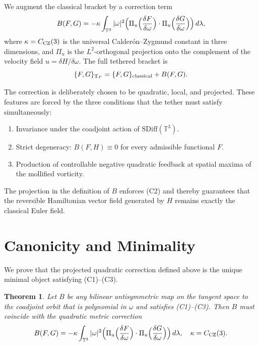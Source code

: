 \documentclass[11pt,a4paper]{article}
\newtheorem{theorem}{Theorem}
\begin{document}
We augment the classical bracket by a correction term
\[
B(F, G) = -\kappa \int_{\mathbb{T}^3} |\omega|^2 \Bigl( \Pi_u \Bigl( \frac{\delta F}{\delta \omega} \Bigr) \cdot \Pi_u \Bigl( \frac{\delta G}{\delta \omega} \Bigr) \Bigr) \, d\lambda,
\]
where $\kappa = C_{\rm CZ}(3)$ is the universal Calderón–Zygmund constant in three dimensions, and $\Pi_u$ is the $L^2$-orthogonal projection onto the complement of the velocity field $u = \delta H / \delta \omega$. The full tethered bracket is
\[
\{F, G\}_{\mathfrak{T}_F} = \{F, G\}_{\rm classical} + B(F, G).
\]

The correction is deliberately chosen to be quadratic, local, and projected. These features are forced by the three conditions that the tether must satisfy simultaneously:

\begin{enumerate}[label=(C\arabic*)]
\item Invariance under the coadjoint action of $\mathrm{SDiff}(\mathbb{T}^3)$.
\item Strict degeneracy: $B(F, H) \equiv 0$ for every admissible functional $F$.
\item Production of controllable negative quadratic feedback at spatial maxima of the mollified vorticity.
\end{enumerate}

The projection in the definition of $B$ enforces (C2) and thereby guarantees that the reversible Hamiltonian vector field generated by $H$ remains exactly the classical Euler field.

\section{Canonicity and Minimality}

We prove that the projected quadratic correction defined above is the unique minimal object satisfying (C1)–(C3).

\begin{theorem}
Let $B$ be any bilinear antisymmetric map on the tangent space to the coadjoint orbit that is polynomial in $\omega$ and satisfies (C1)–(C3). Then $B$ must coincide with the quadratic metric correction
\[
B(F, G) = -\kappa \int_{\mathbb{T}^3} |\omega|^2 \Bigl( \Pi_u \Bigl( \frac{\delta F}{\delta \omega} \Bigr) \cdot \Pi_u \Bigl( \frac{\delta G}{\delta \omega} \Bigr) \Bigr) \, d\lambda, \quad \kappa = C_{\rm CZ}(3).
\]
\end{theorem}
\end{document}
